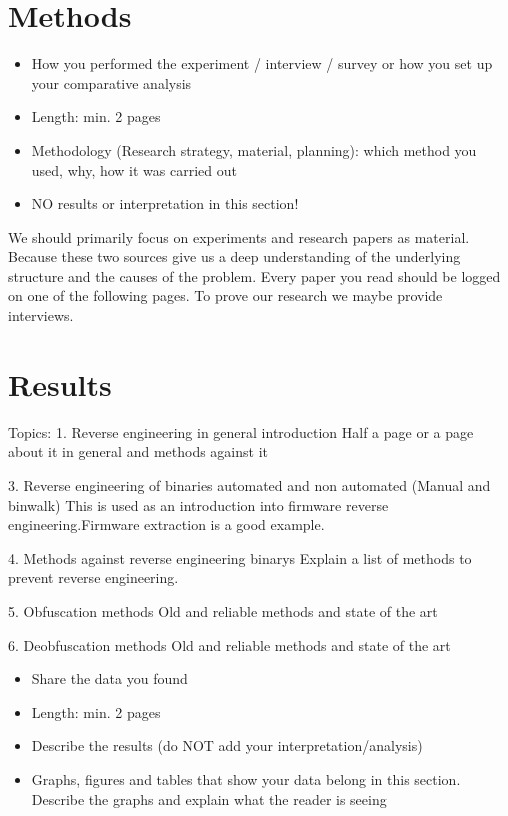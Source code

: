 \documentclass[]{report}
\begin{document}
\section{Methods}
\begin{itemize}
	\item How you performed the experiment / interview / survey or how you set up your comparative analysis
	\item Length: min. 2 pages
	\item Methodology (Research strategy, material, planning): which method you used, why, how it was carried out
	\item NO results or interpretation in this section!
\end{itemize}

We should primarily focus on experiments and research papers as material. Because these two sources give us a deep understanding of the underlying structure and the causes of the problem. Every paper you read should be logged on one of the following pages. To prove our research we maybe provide interviews.

\section{Results}

Topics:
1. Reverse engineering in general introduction 
	Half a page or a page about it in general and methods against it
	
3. Reverse engineering of binaries automated and non automated (Manual and binwalk)
	This is used as an introduction into firmware reverse engineering.Firmware extraction is a good example.

4. Methods against reverse engineering binarys
	Explain a list of methods to prevent reverse engineering.
	
5. Obfuscation methods 
	Old and reliable methods and state of the art
	
6. Deobfuscation methods
	Old and reliable methods and state of the art


\begin{itemize}
	\item Share the data you found
	\item Length: min. 2 pages
	\item Describe the results (do NOT add your interpretation/analysis)
	\item Graphs, figures and tables that show your data belong in this section. Describe the graphs and explain what the reader is seeing

\end{itemize}
\end{document}

